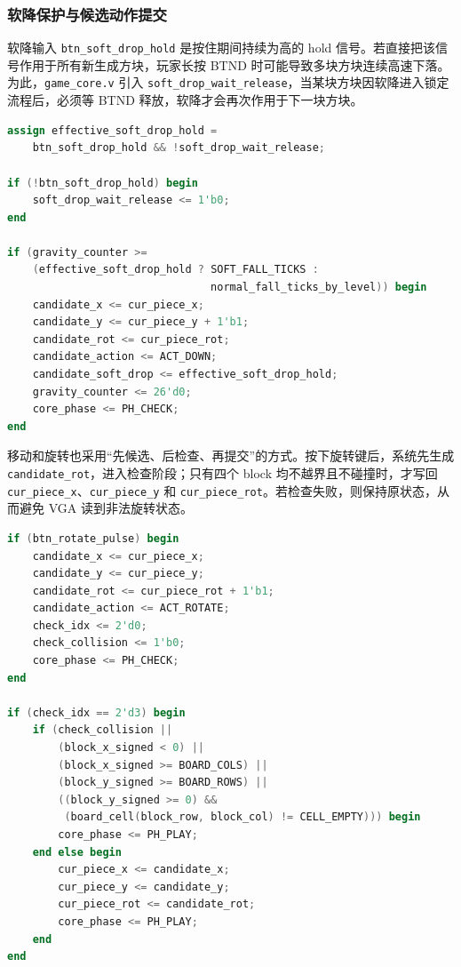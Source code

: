 \documentclass[UTF8,zihao=-4]{ctexart}
\begin{document}
\subsubsection{软降保护与候选动作提交}
软降输入 \texttt{btn\_soft\_drop\_hold} 是按住期间持续为高的 hold 信号。若直接把该信号作用于所有新生成方块，玩家长按 BTND 时可能导致多块方块连续高速下落。为此，\texttt{game\_core.v} 引入 \texttt{soft\_drop\_wait\_release}，当某块方块因软降进入锁定流程后，必须等 BTND 释放，软降才会再次作用于下一块方块。

\begin{lstlisting}[language=Verilog,caption={软降长按保护与下落候选动作},label={lst:soft_drop_guard}]
assign effective_soft_drop_hold =
    btn_soft_drop_hold && !soft_drop_wait_release;

if (!btn_soft_drop_hold) begin
    soft_drop_wait_release <= 1'b0;
end

if (gravity_counter >=
    (effective_soft_drop_hold ? SOFT_FALL_TICKS :
                                normal_fall_ticks_by_level)) begin
    candidate_x <= cur_piece_x;
    candidate_y <= cur_piece_y + 1'b1;
    candidate_rot <= cur_piece_rot;
    candidate_action <= ACT_DOWN;
    candidate_soft_drop <= effective_soft_drop_hold;
    gravity_counter <= 26'd0;
    core_phase <= PH_CHECK;
end
\end{lstlisting}

移动和旋转也采用“先候选、后检查、再提交”的方式。按下旋转键后，系统先生成 \texttt{candidate\_rot}，进入检查阶段；只有四个 block 均不越界且不碰撞时，才写回 \texttt{cur\_piece\_x}、\texttt{cur\_piece\_y} 和 \texttt{cur\_piece\_rot}。若检查失败，则保持原状态，从而避免 VGA 读到非法旋转状态。

\begin{lstlisting}[language=Verilog,caption={旋转候选检查通过后再提交状态},label={lst:candidate_commit}]
if (btn_rotate_pulse) begin
    candidate_x <= cur_piece_x;
    candidate_y <= cur_piece_y;
    candidate_rot <= cur_piece_rot + 1'b1;
    candidate_action <= ACT_ROTATE;
    check_idx <= 2'd0;
    check_collision <= 1'b0;
    core_phase <= PH_CHECK;
end

if (check_idx == 2'd3) begin
    if (check_collision ||
        (block_x_signed < 0) ||
        (block_x_signed >= BOARD_COLS) ||
        (block_y_signed >= BOARD_ROWS) ||
        ((block_y_signed >= 0) &&
         (board_cell(block_row, block_col) != CELL_EMPTY))) begin
        core_phase <= PH_PLAY;
    end else begin
        cur_piece_x <= candidate_x;
        cur_piece_y <= candidate_y;
        cur_piece_rot <= candidate_rot;
        core_phase <= PH_PLAY;
    end
end
\end{lstlisting}
\end{document}
